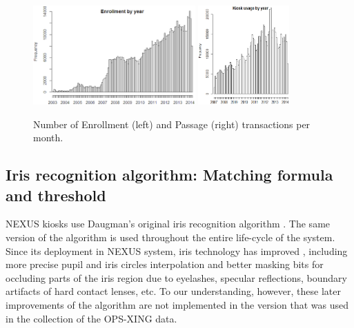 \documentclass{cta-author}%
\begin{document}
\begin{figure}[!b]
\centering
\includegraphics[height=1.5in, width=0.45\linewidth]{eps/en-by-year0.eps} \quad \quad \quad 
\includegraphics[height=1.5in, width=0.3\linewidth]{eps/pa-by-year0.eps} 

\caption{Number of  Enrollment  (left) and Passage (right) transactions    per month. %
}
\label{ftransactions}
\end{figure}




\subsection{Iris recognition algorithm: %
Matching formula and threshold}
\label{s.NormRule}

NEXUS kiosks 
use  Daugman's original iris recognition algorithm \cite{Daugman2002,Daugman2006}. The same version of the algorithm %
is used throughout the entire life-cycle of the system. 
Since its deployment in NEXUS system, iris technology has improved \cite{Daugman2007,Daugman2015}, including
more precise pupil and iris circles interpolation and better   masking bits for occluding parts of the iris region due to eyelashes, specular reflections, boundary artifacts of hard contact lenses, etc.
To our understanding, however, these later improvements of the algorithm are not implemented in the version that was used in the collection of the OPS-XING data.
\end{document}
